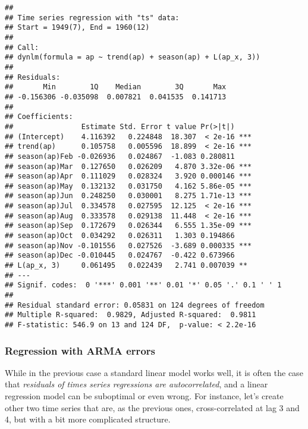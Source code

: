 \documentclass[
]{article}
\begin{document}
\begin{verbatim}
## 
## Time series regression with "ts" data:
## Start = 1949(7), End = 1960(12)
## 
## Call:
## dynlm(formula = ap ~ trend(ap) + season(ap) + L(ap_x, 3))
## 
## Residuals:
##       Min        1Q    Median        3Q       Max 
## -0.156306 -0.035098  0.007821  0.041535  0.141713 
## 
## Coefficients:
##                Estimate Std. Error t value Pr(>|t|)    
## (Intercept)    4.116392   0.224848  18.307  < 2e-16 ***
## trend(ap)      0.105758   0.005596  18.899  < 2e-16 ***
## season(ap)Feb -0.026936   0.024867  -1.083 0.280811    
## season(ap)Mar  0.127650   0.026209   4.870 3.32e-06 ***
## season(ap)Apr  0.111029   0.028324   3.920 0.000146 ***
## season(ap)May  0.132132   0.031750   4.162 5.86e-05 ***
## season(ap)Jun  0.248250   0.030001   8.275 1.71e-13 ***
## season(ap)Jul  0.334578   0.027595  12.125  < 2e-16 ***
## season(ap)Aug  0.333578   0.029138  11.448  < 2e-16 ***
## season(ap)Sep  0.172679   0.026344   6.555 1.35e-09 ***
## season(ap)Oct  0.034292   0.026311   1.303 0.194866    
## season(ap)Nov -0.101556   0.027526  -3.689 0.000335 ***
## season(ap)Dec -0.010445   0.024767  -0.422 0.673966    
## L(ap_x, 3)     0.061495   0.022439   2.741 0.007039 ** 
## ---
## Signif. codes:  0 '***' 0.001 '**' 0.01 '*' 0.05 '.' 0.1 ' ' 1
## 
## Residual standard error: 0.05831 on 124 degrees of freedom
## Multiple R-squared:  0.9829, Adjusted R-squared:  0.9811 
## F-statistic: 546.9 on 13 and 124 DF,  p-value: < 2.2e-16
\end{verbatim}

\subsubsection{Regression with ARMA errors}\label{regression-with-arma-errors}

While in the previous case a standard linear model works well, it is often the case that \emph{residuals of times series regressions are autocorrelated}, and a linear regression model can be suboptimal or even wrong. For instance, let's create other two time series that are, as the previous ones, cross-correlated at lag 3 and 4, but with a bit more complicated structure.
\end{document}
